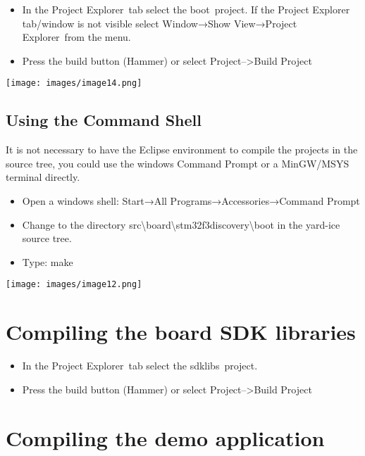 \begin{itemize}
\tightlist
\item
  {In the }{Project Explorer}{~tab select the }{boot}{~project. If the
  Project Explorer tab/window is not visible select }{Window}{→}{Show
  View}{→}{Project Explorer}{~from the menu.}
\item
  {Press the build button (Hammer) or select
  }{Project--\textgreater{}Build Project}
\end{itemize}

{\texttt{[image: images/image14.png]}}

\subsection{\texorpdfstring{{Using the Command
Shell}}{Using the Command Shell}}\label{using-the-command-shell}

{It is not necessary to have the Eclipse environment to compile the
projects in the source tree, you could use the windows Command Prompt or
a MinGW/MSYS terminal directly.}

\begin{itemize}
\tightlist
\item
  {Open a windows shell: Start}{→}{All
  Programs}{→}{Accessories}{→}{Command Prompt}
\item
  {Change to the directory
  src\textbackslash{}board\textbackslash{}stm32f3discovery\textbackslash{}boot
  in the yard-ice source tree.}
\item
  {Type: }{make}
\end{itemize}

{\texttt{[image: images/image12.png]}}

{}

\hypertarget{h.26in1rg}{\section{\texorpdfstring{{Compiling the board
SDK libraries}}{Compiling the board SDK libraries}}\label{h.26in1rg}}

\begin{itemize}
\tightlist
\item
  {In the }{Project Explorer}{~tab select the }{sdklibs}{~project.}
\item
  {Press the build button (Hammer) or select
  }{Project--\textgreater{}Build Project}
\end{itemize}

\hypertarget{h.lnxbz9}{\section{\texorpdfstring{{Compiling the demo
application}}{Compiling the demo application}}\label{h.lnxbz9}}

